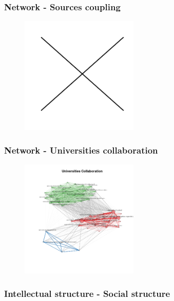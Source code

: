 \documentclass[aspectratio=169]{beamer}
\begin{document}
\begin{frame}
	\frametitle{Network - Sources coupling}
	\begin{figure}
		\centering
		\includegraphics[width=0.5\textwidth]
		{figures/bnet_sources_coupling.png}
	\end{figure}
\end{frame}

\begin{frame}
	\frametitle{Network - Universities collaboration}
	\begin{figure}
		\centering
		\includegraphics[width=0.5\textwidth]
		{figures/bnet_universities_collaboration.png}
	\end{figure}
\end{frame}


\subsubsection{Intellectual structure - Social structure}


\end{document}
